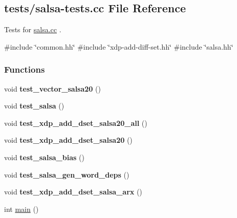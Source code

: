 \hypertarget{salsa-tests_8cc}{\subsection{tests/salsa-\/tests.cc \-File \-Reference}
\label{salsa-tests_8cc}
}


\-Tests for \hyperlink{salsa_8cc}{salsa.\-cc} .  


{\ttfamily \#include \char`\"{}common.\-hh\char`\"{}}\*
{\ttfamily \#include \char`\"{}xdp-\/add-\/diff-\/set.\-hh\char`\"{}}\*
{\ttfamily \#include \char`\"{}salsa.\-hh\char`\"{}}\*
\subsubsection*{\-Functions}
\begin{DoxyCompactItemize}
\item 
\hypertarget{salsa-tests_8cc_aeed979c28cf862913f8d6c0fef0087ca}{void {\bfseries test\-\_\-vector\-\_\-salsa20} ()}\label{salsa-tests_8cc_aeed979c28cf862913f8d6c0fef0087ca}

\item 
\hypertarget{salsa-tests_8cc_a468c01c2bf1401f5a8132c8fef2f7fae}{void {\bfseries test\-\_\-salsa} ()}\label{salsa-tests_8cc_a468c01c2bf1401f5a8132c8fef2f7fae}

\item 
\hypertarget{salsa-tests_8cc_ab12185122ae62af984f11a336e0a4b47}{void {\bfseries test\-\_\-xdp\-\_\-add\-\_\-dset\-\_\-salsa20\-\_\-all} ()}\label{salsa-tests_8cc_ab12185122ae62af984f11a336e0a4b47}

\item 
\hypertarget{salsa-tests_8cc_a6cc6813332a898fffc89518a21f4d7d7}{void {\bfseries test\-\_\-xdp\-\_\-add\-\_\-dset\-\_\-salsa20} ()}\label{salsa-tests_8cc_a6cc6813332a898fffc89518a21f4d7d7}

\item 
\hypertarget{salsa-tests_8cc_a876fc6326cbfecad1a8798dde45701d9}{void {\bfseries test\-\_\-salsa\-\_\-bias} ()}\label{salsa-tests_8cc_a876fc6326cbfecad1a8798dde45701d9}

\item 
\hypertarget{salsa-tests_8cc_a10c3e9f1dae33bf1b2b0976cdee7c3ed}{void {\bfseries test\-\_\-salsa\-\_\-gen\-\_\-word\-\_\-deps} ()}\label{salsa-tests_8cc_a10c3e9f1dae33bf1b2b0976cdee7c3ed}

\item 
\hypertarget{salsa-tests_8cc_aa80c32ee1171989bc2a9e232f928d747}{void {\bfseries test\-\_\-xdp\-\_\-add\-\_\-dset\-\_\-salsa\-\_\-arx} ()}\label{salsa-tests_8cc_aa80c32ee1171989bc2a9e232f928d747}

\item 
int \hyperlink{salsa-tests_8cc_ae66f6b31b5ad750f1fe042a706a4e3d4}{main} ()
\end{DoxyCompactItemize}
